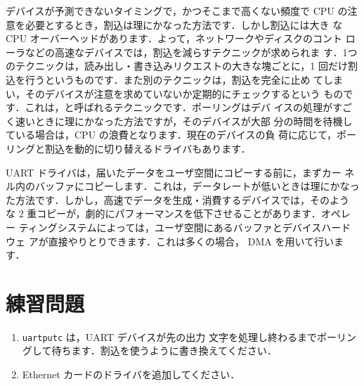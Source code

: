 デバイスが予測できないタイミングで，かつそこまで高くない頻度で CPU の注
意を必要とするとき，割込は理にかなった方法です．しかし割込には大き
なCPU オーバーヘッドがあります．よって，ネットワークやディスクのコント
ローラなどの高速なデバイスでは，割込を減らすテクニックが求められま
す．1つのテクニックは，読み出し・書き込みリクエストの大きな塊ごとに，1
回だけ割込を行うというものです．また別のテクニックは，割込を完全に止め
てしまい，そのデバイスが注意を求めていないか定期的にチェックするという
ものです．これは，と呼ばれるテクニックです．ポーリングはデバ
イスの処理がすごく速いときに理にかなった方法ですが，そのデバイスが大部
分の時間を待機している場合は，CPU の浪費となります．現在のデバイスの負
荷に応じて，ポーリングと割込を動的に切り替えるドライバもあります．

UART ドライバは，届いたデータをユーザ空間にコピーする前に，まずカー
ネル内のバッファにコピーします．これは，データレートが低いときは理にかなっ
た方法です．しかし，高速でデータを生成・消費するデバイスでは，そのよう
な 2 重コピーが，劇的にパフォーマンスを低下させることがあります．オペレー
ティングシステムによっては，ユーザ空間にあるバッファとデバイスハードウェ
アが直接やりとりできます．これは多くの場合， DMA を用いて行います．

\section{練習問題}

\begin{enumerate}

\item \texttt{uartputc}  は，UART デバイスが先の出力
  文字を処理し終わるまでポーリングして待ちます．割込を使うように書き換えてください．

\item Ethernet カードのドライバを追加してください．

\end{enumerate}
